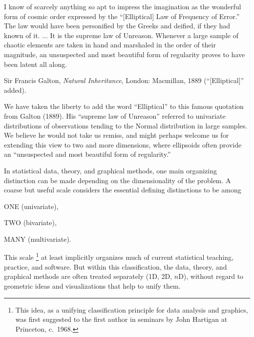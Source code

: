 
\epigraph{I know of scarcely anything so apt to impress the imagination as the
wonderful form of cosmic order expressed by the ``[Elliptical] Law of Frequency of
Error.''
The law would have been personified by the Greeks and deified, if they had known of it.
... %
    It is the supreme law of Unreason.
	Whenever a large sample of chaotic elements are taken in hand
	and marshaled in the order of their magnitude,
	an unsuspected and most beautiful form of regularity proves to have been
	latent all along.
}
{Sir Francis Galton, \emph{Natural Inheritance}, London: Macmillan, 1889
(``[Elliptical]'' added).
}

We have taken the liberty to add the word ``Elliptical'' to this famous quotation from Galton (1889).
His ``supreme law of Unreason'' referred to univariate distributions of observations tending to the
Normal distribution in large samples.  We believe he would not take us remiss, and might perhaps
welcome us for extending this view to
two and more dimensions, where ellipsoids often provide
an ``unsuspected and most beautiful form of regularity.''

In statistical data, theory, and graphical methods, one main organizing
distinction can be made depending
on the dimensionality of the problem.  A coarse but useful scale considers the essential defining
distinctions to be among
\begin{itemize*}
 \item ONE (univariate),
 \item TWO (bivariate),
 \item MANY (multivariate).
\end{itemize*}
This scale%
\footnote{
This idea, as a unifying classification principle for data analysis and graphics,
was first suggested to the first author in
seminars by John Hartigan at Princeton, c.~1968.
}
at least implicitly organizes much of current statistical teaching, practice, and software.
But within this classification, the data, theory, and graphical methods are often treated separately (1D, 2D, $n$D),
without regard to geometric ideas and visualizations that help to unify them.

